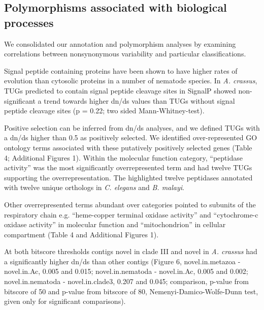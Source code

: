 \documentclass[10pt]{bmc_article}
\newenvironment{bmcformat}{\begin{raggedright}\baselineskip20pt\sloppy\setboolean{publ}{false}}{\end{raggedright}\baselineskip20pt\sloppy}
\begin{document}
\begin{bmcformat}
\subsection*{Polymorphisms associated with biological processes}

We consolidated our annotation and polymorphism analyses by examining
correlations between nonsynonymous variability and particular
classifications.

Signal peptide containing proteins have been shown to have higher
rates of evolution than cytosolic proteins in a number of nematode
species. In \textit{A. crassus}, TUGs predicted to contain signal
peptide cleavage sites in SignalP showed non-significant a trend
towards higher dn/ds values than TUGs without signal peptide cleavage
sites (p = 0.22; two sided
Mann-Whitney-test).

Positive selection can be inferred from dn/ds analyses, and we defined
TUGs with a dn/ds higher than 0.5 as positively selected. We
identified over-represented GO ontology terms associated with these
putatively positively selected genes (Table 4; Additional Figures
1). Within the molecular function category, ``peptidase activity'' was
the most significantly overrepresented term and had twelve TUGs
supporting the overrepresentation. The highlighted twelve peptidases
annotated with twelve unique orthologs in \textit{C. elegans} and
\textit{B. malayi}.



Other overrepresented terms abundant over categories pointed to
subunits of the respiratory chain e.g. ``heme-copper terminal oxidase
activity'' and ``cytochrome-c oxidase activity'' in molecular function
and ``mitochondrion'' in cellular compartment (Table 4 and Additional
Figures 1).

At both bitscore thresholds contigs novel in clade III and novel in
\textit{A. crassus} had a significantly higher dn/ds than other
contigs (Figure 6, novel.in.metazoa - novel.in.Ac, 0.005 and 0.015;
novel.in.nematoda - novel.in.Ac, 0.005 and 0.002; novel.in.nematoda -
novel.in.clade3, 0.207 and 0.045; comparison, p-value from bitscore of
50 and p-value from bitscore of 80, Nemenyi-Damico-Wolfe-Dunn test,
given only for significant comparisons).


\end{bmcformat}
\end{document}
